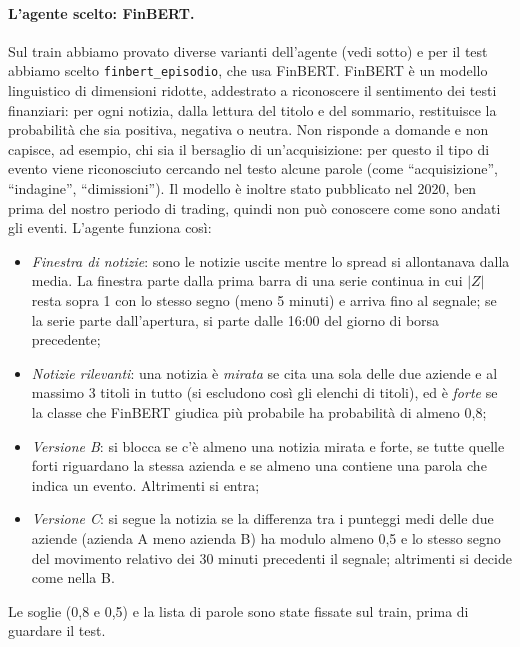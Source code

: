 \documentclass[11pt,a4paper]{article}
\begin{document}
\paragraph{L'agente scelto: FinBERT.} Sul train abbiamo provato diverse varianti dell'agente (vedi sotto) e per il test abbiamo scelto \texttt{finbert\_episodio}, che usa FinBERT. FinBERT è un modello linguistico di dimensioni ridotte, addestrato a riconoscere il sentimento dei testi finanziari: per ogni notizia, dalla lettura del titolo e del sommario, restituisce la probabilità che sia positiva, negativa o neutra. Non risponde a domande e non capisce, ad esempio, chi sia il bersaglio di un'acquisizione: per questo il tipo di evento viene riconosciuto cercando nel testo alcune parole (come ``acquisizione'', ``indagine'', ``dimissioni''). Il modello è inoltre stato pubblicato nel 2020, ben prima del nostro periodo di trading, quindi non può conoscere come sono andati gli eventi. L'agente funziona così:
\begin{itemize}
  \item \emph{Finestra di notizie}: sono le notizie uscite mentre lo spread si allontanava dalla media. La finestra parte dalla prima barra di una serie continua in cui $|Z|$ resta sopra 1 con lo stesso segno (meno 5 minuti) e arriva fino al segnale; se la serie parte dall'apertura, si parte dalle 16:00 del giorno di borsa precedente;
  \item \emph{Notizie rilevanti}: una notizia è \emph{mirata} se cita una sola delle due aziende e al massimo 3 titoli in tutto (si escludono così gli elenchi di titoli), ed è \emph{forte} se la classe che FinBERT giudica più probabile ha probabilità di almeno 0,8;
  \item \emph{Versione B}: si blocca se c'è almeno una notizia mirata e forte, se tutte quelle forti riguardano la stessa azienda e se almeno una contiene una parola che indica un evento. Altrimenti si entra;
  \item \emph{Versione C}: si segue la notizia se la differenza tra i punteggi medi delle due aziende (azienda A meno azienda B) ha modulo almeno 0,5 e lo stesso segno del movimento relativo dei 30 minuti precedenti il segnale; altrimenti si decide come nella B.
\end{itemize}
Le soglie (0,8 e 0,5) e la lista di parole sono state fissate sul train, prima di guardare il test.
\end{document}
